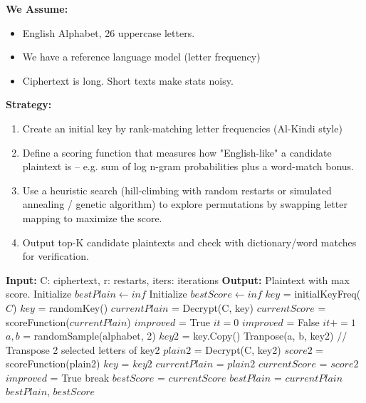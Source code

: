 \documentclass[]{article}
\numberwithin{figure}{section}
\begin{document}
\noindent \textbf{We Assume:} 
\begin{itemize}
	\item English Alphabet, 26 uppercase letters.
	\item We have a reference language model (letter frequency)
	\item Ciphertext is long. Short texts make stats noisy.
\end{itemize} 
\textbf{Strategy:}
\begin{enumerate}
	\item Create an initial key by rank-matching letter frequencies (Al-Kindi style)
	\item Define a scoring function that measures how "English-like" a candidate plaintext is -- e.g. sum of log n-gram probabilities plus a word-match bonus.
	\item Use a heuristic search (hill-climbing with random restarts or simulated annealing / genetic algorithm) to explore permutations by swapping letter mapping to maximize the score.
	\item Output top-K candidate plaintexts and check with dictionary/word matches for verification.
\end{enumerate}
\begin{algorithm}
	\caption{}
	\begin{algorithmic}
		\STATE \textbf{Input:} C: ciphertext, r: restarts, iters: iterations
		\STATE \textbf{Output:} Plaintext with max score.
		\STATE Initialize $bestPlain \gets inf$
		\STATE Initialize $bestScore \gets inf$
				\STATE $key$ = initialKeyFreq($C$)
			\ELSE 
				\STATE $key$ = randomKey() 
			\ENDIF
			\STATE $currentPlain$ = Decrypt(C, key)
			\STATE $currentScore$ = scoreFunction($currentPlain$)
			\STATE $improved$ = True  
			\STATE $it = 0$
				\STATE $improved$ = False 
				\STATE $it += 1$
					\STATE $a, b$ = randomSample(alphabet, 2)
					\STATE $key2$ = key.Copy()
					\STATE Tranpose(a, b, key2) // Transpose 2 selected letters of key2
					\STATE $plain2$ = Decrypt(C, key2)
					\STATE $score2$ = scoreFunction(plain2)
						\STATE $key$ = $key2$
						\STATE $currentPlain$ = $plain2$
						\STATE $currentScore$ = $score2$
						\STATE $improved$ = True
						break
					\ENDIF
				\ENDFOR
			\ENDWHILE
				\STATE $bestScore$ = $currentScore$
				\STATE $bestPlain$ = $currentPlain$
			\ENDIF
		\ENDFOR
		\RETURN $bestPlain$, $bestScore$
	\end{algorithmic}
\end{algorithm}
\end{document}
